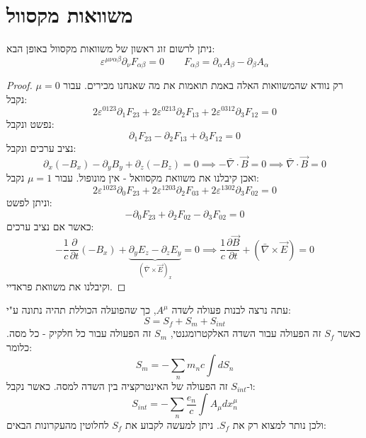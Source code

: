 \documentclass{tstextbook}
\begin{document}
\section{משוואות מקסוול}

\begin{proposition}
ניתן לרשום זוג ראשון של משוואות מקסוול באופן הבא:
$$\varepsilon^{\mu \nu \alpha \beta}\partial_{\nu}F_{\alpha \beta}=0\qquad F_{\alpha \beta}=\partial_{\alpha}A_{\beta}-\partial_{\beta}A_{\alpha}$$

\end{proposition}
\begin{proof}
רק נוודא שהמשוואות האלה באמת תואמות את מה שאנחנו מכירים. עבור \(\mu=0\) נקבל:
$$2\varepsilon^{0123}\partial_{1}F_{23}+2\varepsilon^{0213}\partial_{2}F_{13}+2\varepsilon^{0312}\partial_{3}F_{12}=0$$
נפשט ונקבל:
$$\partial_{1}F_{23}-\partial_{2}F_{13}+\partial_{3}F_{12}=0$$
נציב ערכים ונקבל:
$$\partial_{x} (-B_{x})-\partial_{y}B_{y}+\partial_{z}(-B_{z})=0\implies -\bar{\nabla} \cdot \vec{B}=0\implies \bar{\nabla} \cdot \vec{B}=0$$
ואכן קיבלנו את משוואת מקסוואל - אין מונופול.
עבור \(\mu=1\) נקבל:
$$2\varepsilon^{1023}\partial_{0} F_{23}+2\varepsilon^{1203}\partial _{2}F_{03}+2\varepsilon^{1302}\partial_{3}F_{02}=0$$
וניתן לפשט:
$$-\partial_{0}F_{23}+\partial_{2}F_{02}-\partial_{3}F_{02}=0$$
כאשר אם נציב ערכים:
$$-\frac{1}{c}\frac{\partial }{\partial t} (-B_{x})+\underbrace{ \partial_{y}E_{z}-\partial_{z}E_{y} }_{ \left( \bar{\nabla} \times \vec{E} \right)_{x} }=0\implies \frac{1}{c}\frac{\partial \vec{B}}{\partial t} +\left( \bar{\nabla} \times \vec{E} \right)=0$$
וקיבלנו את משוואת פראדיי.

\end{proof}
עתה נרצה לבנות פעולה לשדה \(A^\mu\), כך שהפועלה הכוללת תהיה נתונה ע"י:
$$S=S_{f}+S_{m}+S_{int}$$
כאשר \(S_{f}\) זה הפעולה עבור השדה האלקטרומגנטי, \(S_{m}\) זה הפעולה עבור כל חלקיק - כל מסה. כלומר:
$$S_{m}=-\sum_{n}m_{n}c\int dS_{n}$$
ו-\(S_{int}\) זה הפעולה של האינטרקציה בין השדה למסה. כאשר נקבל:
$$S_{int} = - \sum_{n} \frac{e_{n}}{c}\int A_{\mu} dx^\mu_{n}$$
ולכן נותר למצוא רק את \(S_{f}\). ניתן למעשה לקבוע את \(S_{f}\) לחלוטין מהעקרונות הבאים:
\end{document}
